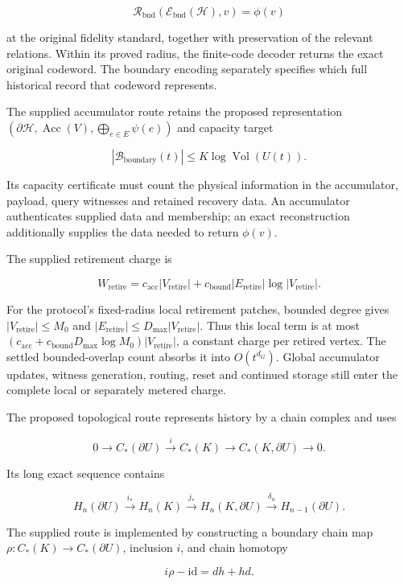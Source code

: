 \documentclass[
]{article}
\begin{document}
\[
\mathcal R_{\mathrm{bnd}}(\mathcal E_{\mathrm{bnd}}(\mathcal H),v)=\phi(v)
\]

at the original fidelity standard, together with preservation of the
relevant relations. Within its proved radius, the finite-code decoder
returns the exact original codeword. The boundary encoding separately
specifies which full historical record that codeword represents.

The supplied accumulator route retains the proposed representation
\((\partial\mathcal H,\operatorname{Acc}(V),\bigoplus_{e\in E}\psi(e))\)
and capacity target

\[
|\mathcal B_{\mathrm{boundary}}(t)|\le K\log\operatorname{Vol}(U(t)).
\]

Its capacity certificate must count the physical information in the
accumulator, payload, query witnesses and retained recovery data. An
accumulator authenticates supplied data and membership; an exact
reconstruction additionally supplies the data needed to return
\(\phi(v)\).

The supplied retirement charge is

\[
W_{\mathrm{retire}}
=c_{\mathrm{acc}}|V_{\mathrm{retire}}|
+c_{\mathrm{bound}}|E_{\mathrm{retire}}|\log|V_{\mathrm{retire}}|.
\]

For the protocol's fixed-radius local retirement patches, bounded degree
gives \(|V_{\mathrm{retire}}|\le M_0\) and
\(|E_{\mathrm{retire}}|\le D_{\max}|V_{\mathrm{retire}}|\). Thus this
local term is at most
\((c_{\mathrm{acc}}+c_{\mathrm{bound}}D_{\max}\log M_0)|V_{\mathrm{retire}}|\),
a constant charge per retired vertex. The settled bounded-overlap count
absorbs it into \(O(t^{d_G})\). Global accumulator updates, witness
generation, routing, reset and continued storage still enter the
complete local or separately metered charge.

The proposed topological route represents history by a chain complex and
uses

\[
0\longrightarrow C_*(\partial U)\xrightarrow{i}C_*(K)
\longrightarrow C_*(K,\partial U)\longrightarrow0.
\]

Its long exact sequence contains

\[
H_n(\partial U)\xrightarrow{i_*}H_n(K)\xrightarrow{j_*}
H_n(K,\partial U)\xrightarrow{\delta_n}H_{n-1}(\partial U).
\]

The supplied route is implemented by constructing a boundary chain map
\(\rho:C_*(K)\to C_*(\partial U)\), inclusion \(i\), and chain homotopy

\[
i\rho-\mathrm{id}=dh+hd.
\]
\end{document}
